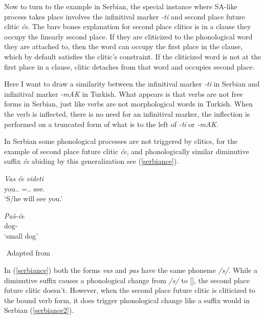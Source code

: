 Now to turn to the example in Serbian, the special instance where SA-like process takes place involves the infinitival marker \textit{-ti} and second place future clitic \textit{\'{c}e}. The bare bones explanation for second place clitics is in a clause they occupy the linearly second place. If they are cliticized to the phonological word they are attached to, then the word can occupy the first place in the clause, which by default satisfies the clitic's constraint. If the cliticized word is not at the first place in a clause, clitic detaches from that word and occupies second place.

Here I want to draw a similarity between the infinitival marker \textit{-ti} in Serbian and infinitival marker \textit{-mAK} in Turkish. What appears is that verbs are not free forms in Serbian, just like verbs are not morphological words in Turkish. When the verb is inflected, there is no need for an infinitival marker, the inflection is performed on a truncated form of what is to the left of \textit{-ti} or \textit{-mAK}.

In Serbian some phonological processes are not triggered by clitics, for the example of second place future clitic \textit{\'{c}e}, and phonologically similar diminutive suffix \textit{\'{c}e} abiding by this generalization see (\ref{serbiance}).

\begin{exe}
    \ex \label{serbiance}
    \begin{xlist}

        \ex \gll
        \textit{Vas} \textit{\'{c}e} \textit{videti} \\ you.{\Pl}.{\Acc} ={\Aux}.{\Tsg}.{\Fut} see.{\Inf} \\
        \glt `S/he will see you.'
 
        \ex \gll 
        \textit{Pa\u{s}-\'{c}e} \\ dog-{\Dim} \\
        \glt `small dog'

    \end{xlist}
    ${}$ \hfill Adapted from \cite{despic2017suspended}
\end{exe}

In (\ref{serbiance}) both the forms \textit{vas} and \textit{pas} have the same phoneme \textit{/s/}. While a diminutive suffix causes a phonological change from \textit{/s/} to [\textesh], the second place future clitic doesn't. However, when the second place future clitic is cliticized to the bound verb form, it does trigger phonological change like a suffix would in Serbian (\ref{serbiance2}).

